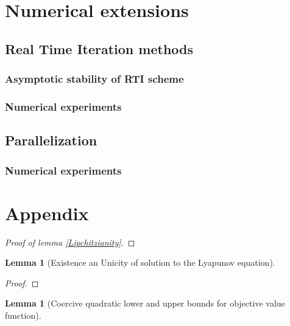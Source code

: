 \documentclass[12pt]{article}
\newtheorem{lemma}[theorem]{Lemma}
\theoremstyle{definition}
\theoremstyle{remark}
\begin{document}
\section{Numerical extensions}

\subsection{Real Time Iteration methods}
\subsubsection{Asymptotic stability of RTI scheme}
\subsubsection{Numerical experiments}

\subsection{Parallelization}
\subsubsection{Numerical experiments}

\section{Appendix}
\begin{proof}[Proof of lemma \ref{Lipchitzianity}]

\end{proof}

\begin{lemma}[Existence an Unicity of solution to the Lyapunov equation]
	
\end{lemma}

\begin{proof}
	
\end{proof}

\begin{lemma}[Coercive quadratic lower and upper bounds for objective value function]

\end{lemma}
\end{document}
